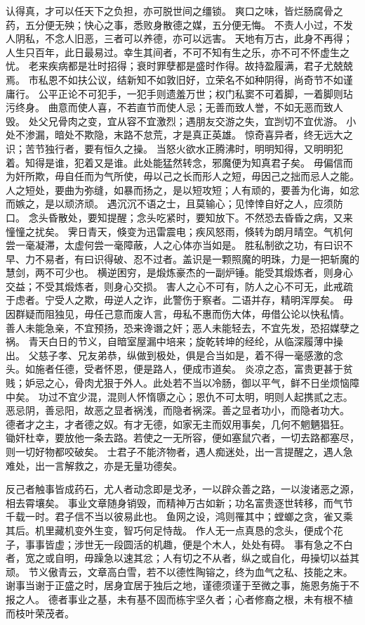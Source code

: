 \documentclass[12pt,UTF8]{ctexbook}
\begin{document}
认得真，才可以任天下之负担，亦可脱世间之缰锁。
爽口之味，皆烂肠腐骨之药，五分便无殃；快心之事，悉败身散德之媒，五分便无悔。
不责人小过，不发人阴私，不念人旧恶，三者可以养德，亦可以远害。
天地有万古，此身不再得；人生只百年，此日最易过。幸生其间者，不可不知有生之乐，亦不可不怀虚生之忧。
老来疾病都是壮时招得；衰时罪孽都是盛时作得。故持盈履满，君子尤兢兢焉。
市私恩不如扶公议，结新知不如敦旧好，立荣名不如种阴得，尚奇节不如谨庸行。
公平正论不可犯手，一犯手则遗羞万世；权门私窦不可着脚，一着脚则玷污终身。
曲意而使人喜，不若直节而使人忌；无善而致人誉，不如无恶而致人毁。
处父兄骨肉之变，宜从容不宜激烈；遇朋友交游之失，宜剀切不宜优游。
小处不渗漏，暗处不欺隐，末路不怠荒，才是真正英雄。
惊奇喜异者，终无远大之识；苦节独行者，要有恒久之操。
当怒火欲水正腾沸时，明明知得，又明明犯着。知得是谁，犯着又是谁。此处能猛然转念，邪魔便为知真君子矣。
毋偏信而为奸所欺，毋自任而为气所使，毋以己之长而形人之短，毋因己之拙而忌人之能。
人之短处，要曲为弥缝，如暴而扬之，是以短攻短；人有顽的，要善为化诲，如忿而嫉之，是以顽济顽。
遇沉沉不语之士，且莫输心；见悻悻自好之人，应须防口。
念头昏散处，要知提醒；念头吃紧时，要知放下。不然恐去昏昏之病，又来憧憧之扰矣。
霁日青天，倏变为迅雷震电；疾风怒雨，倏转为朗月晴空。气机何尝一毫凝滞，太虚何尝一毫障蔽，人之心体亦当如是。
胜私制欲之功，有曰识不早、力不易者，有曰识得破、忍不过者。盖识是一颗照魔的明珠，力是一把斩魔的慧剑，两不可少也。
横逆困穷，是煅炼豪杰的一副炉锤。能受其煅炼者，则身心交益；不受其煅炼者，则身心交损。
害人之心不可有，防人之心不可无，此戒疏于虑者。宁受人之欺，毋逆人之诈，此警伤于察者。二语并存，精明浑厚矣。
毋因群疑而阻独见，毋任己意而废人言，毋私不惠而伤大体，毋借公论以快私情。
善人未能急亲，不宜预扬，恐来谗谮之奸；恶人未能轻去，不宜先发，恐招媒孽之祸。
青天白日的节义，自暗室屋漏中培来；旋乾转坤的经纶，从临深履薄中操出。
父慈子孝、兄友弟恭，纵做到极处，俱是合当如是，着不得一毫感激的念头。如施者任德，受者怀恩，便是路人，便成市道矣。
炎凉之态，富贵更甚于贫贱；妒忌之心，骨肉尤狠于外人。此处若不当以冷肠，御以平气，鲜不日坐烦恼障中矣。
功过不宜少混，混则人怀惰隳之心；恩仇不可太明，明则人起携贰之志。
恶忌阴，善忌阳，故恶之显者祸浅，而隐者祸深。善之显者功小，而隐者功大。
德者才之主，才者德之奴。有才无德，如家无主而奴用事矣，几何不魍魉猖狂。
锄奸杜幸，要放他一条去路。若使之一无所容，便如塞鼠穴者，一切去路都塞尽，则一切好物都咬破矣。
士君子不能济物者，遇人痴迷处，出一言提醒之，遇人急难处，出一言解救之，亦是无量功德矣。

反己者触事皆成药石，尤人者动念即是戈矛，一以辟众善之路，一以浚诸恶之源，相去霄壤矣。
事业文章随身销毁，而精神万古如新；功名富贵逐世转移，而气节千载一时。君子信不当以彼易此也。
鱼网之设，鸿则罹其中；螳螂之贪，雀又乘其后。机里藏机变外生变，智巧何足恃哉。
作人无一点真恳的念头，便成个花子，事事皆虚；涉世无一段圆活的机趣，便是个木人，处处有碍。
事有急之不白者，宽之或自明，毋躁急以速其忿；人有切之不从者，纵之或自化，毋操切以益其顽。
节义傲青云，文章高白雪，若不以德性陶镕之，终为血气之私、技能之末。
谢事当谢于正盛之时，居身宜居于独后之地，谨德须谨于至微之事，施恩务施于不报之人。
德者事业之基，未有基不固而栋宇坚久者；心者修裔之根，未有根不植而枝叶荣茂者。

\backmatter
\end{document}
